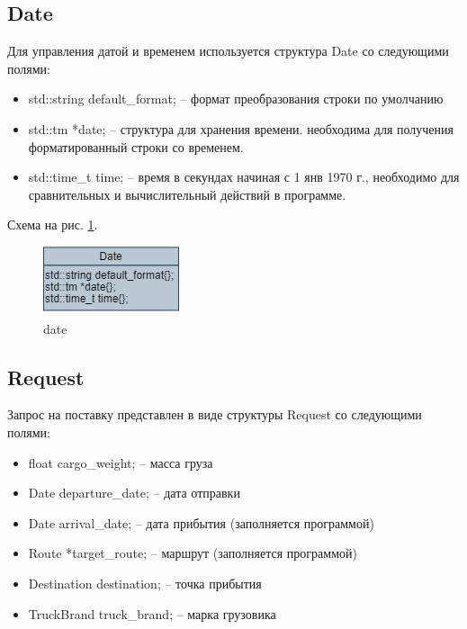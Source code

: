 \subsection{Date}

Для управления датой и временем используется структура Date со следующими полями: 

\begin{itemize}
    \item std::string default\_format{}; -- формат преобразования строки по умолчанию
    \item std::tm *date{}; -- структура для хранения времени. необходима для получения форматированный строки со временем.
    \item std::time\_t time{}; -- время в секундах начиная с 1 янв 1970 г., необходимо для сравнительных и вычислительный действий в программе.
\end{itemize}

Схема на рис. \ref{date}.

\begin{figure}[hpt!]
    \centering
    \includegraphics[width=0.4\linewidth]{photo/data_structures/date}
    \caption{date}
    \label{date}
\end{figure}

\subsection{Request}

Запрос на поставку представлен в виде структуры Request со следующими полями: 

\begin{itemize}
    \item float cargo\_weight{}; -- масса груза
    \item Date departure\_date{}; -- дата отправки
    \item Date arrival\_date{}; -- дата прибытия (заполняется программой)
    \item Route *target\_route{}; -- маршрут (заполняется программой)
    \item Destination destination; -- точка прибытия
    \item TruckBrand truck\_brand; -- марка грузовика
\end{itemize}

